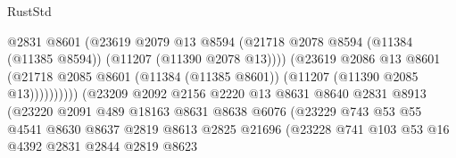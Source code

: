 \begin{lexlean}{RustStd}
\begin{coremodule}
                                          @2831
                                          @8601
                                          (@23619
                                            @2079
                                            @13
                                            @8594
                                            (@21718
                                              @2078
                                              @8594
                                              (@11384 (@11385 @8594))
                                              (@11207 (@11390 @2078 @13))))
                                          (@23619
                                            @2086
                                            @13
                                            @8601
                                            (@21718
                                              @2085
                                              @8601
                                              (@11384 (@11385 @8601))
                                              (@11207 (@11390 @2085 @13))))))))))
                              (@23209
                                @2092
                                @2156
                                @2220
                                @13
                                @8631
                                @8640
                                @2831
                                @8913
                                (@23220
                                  @2091
                                  @489
                                  @18163
                                  @8631
                                  @8638
                                  @6076
                                  (@23229
                                    @743
                                    @53
                                    @55
                                    @4541
                                    @8630
                                    @8637
                                    @2819
                                    @8613
                                    @2825
                                    @21696
                                    (@23228
                                      @741
                                      @103
                                      @53
                                      @16
                                      @4392
                                      @2831
                                      @2844
                                      @2819
                                      @8623

\end{coremodule}
\end{lexlean}

